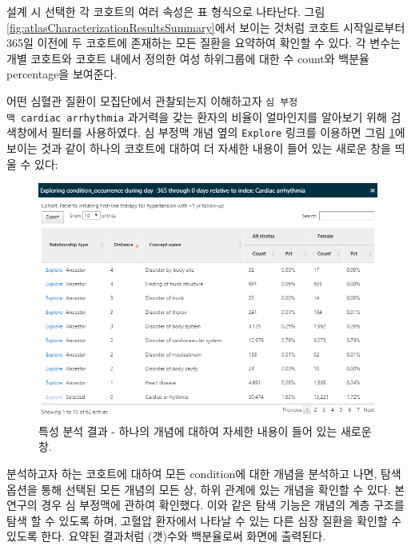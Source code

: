\documentclass[10.5pt]{book}
\theoremstyle{definition}
\theoremstyle{definition}
\theoremstyle{definition}
\theoremstyle{remark}
\begin{document}
설계 시 선택한 각 코호트의 여러 속성은 표 형식으로 나타난다. 그림
\ref{fig:atlasCharacterizationResultsSummary}에서 보이는 것처럼 코호트
시작일로부터 365일 이전에 두 코호트에 존재하는 모든 질환을 요약하여
확인할 수 있다. 각 변수는 개별 코호트와 코호트 내에서 정의한 여성
하위그룹에 대한 수 count와 백분율 percentage을 보여준다.

어떤 심혈관 질환이 모집단에서 관찰되는지 이해하고자
\texttt{심\ 부정맥\ cardiac\ arrhythmia} 과거력을 갖는 환자의 비율이
얼마인지를 알아보기 위해 검색창에서 필터를 사용하였다. 심 부정맥 개념
옆의 \texttt{Explore} 링크를 이용하면 그림
\ref{fig:atlasCharacterizationResultsExplore}에 보이는 것과 같이 하나의
코호트에 대하여 더 자세한 내용이 들어 있는 새로운 창을 띄울 수 있다:

\begin{figure}

{\centering \includegraphics[width=1\linewidth]{images/Characterization/atlasCharacterizationResultsExplore} 

}

\caption{특성 분석 결과 - 하나의 개념에 대하여 자세한 내용이 들어 있는 새로운 창.}\label{fig:atlasCharacterizationResultsExplore}
\end{figure}

분석하고자 하는 코호트에 대하여 모든 condition에 대한 개념을 분석하고
나면, 탐색 옵션을 통해 선택된 모든 개념의 모든 상, 하위 관계에 있는
개념을 확인할 수 있다. 본 연구의 경우 심 부정맥에 관하여 확인했다. 이와
같은 탐색 기능은 개념의 계층 구조를 탐색 할 수 있도록 하며, 고혈압
환자에서 나타날 수 있는 다른 심장 질환을 확인할 수 있도록 한다. 요약된
결과처럼 (갯)수와 백분율로써 화면에 출력된다.
\end{document}
